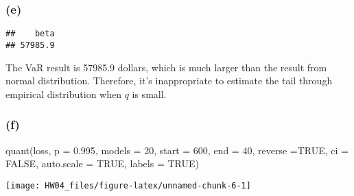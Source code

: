 \documentclass[
]{article}
\newenvironment{Shaded}{\begin{snugshade}}{\end{snugshade}}
\newcommand{\AttributeTok}[1]{\textcolor[rgb]{0.77,0.63,0.00}{#1}}
\newcommand{\ConstantTok}[1]{\textcolor[rgb]{0.00,0.00,0.00}{#1}}
\newcommand{\DecValTok}[1]{\textcolor[rgb]{0.00,0.00,0.81}{#1}}
\newcommand{\FloatTok}[1]{\textcolor[rgb]{0.00,0.00,0.81}{#1}}
\newcommand{\FunctionTok}[1]{\textcolor[rgb]{0.00,0.00,0.00}{#1}}
\newcommand{\NormalTok}[1]{#1}
\newcommand{\OtherTok}[1]{\textcolor[rgb]{0.56,0.35,0.01}{#1}}
\newcommand{\SpecialCharTok}[1]{\textcolor[rgb]{0.00,0.00,0.00}{#1}}
\begin{document}
\hypertarget{e}{%
\subsubsection{(e)}\label{e}}

\begin{Shaded}
\end{Shaded}

\begin{verbatim}
##    beta 
## 57985.9
\end{verbatim}

The VaR result is 57985.9 dollars, which is much larger than the result
from normal distribution. Therefore, it's inappropriate to estimate the
tail through empirical distribution when \(q\) is small.

\hypertarget{f}{%
\subsubsection{(f)}\label{f}}

\begin{Shaded}
\begin{Highlighting}[]
\FunctionTok{quant}\NormalTok{(loss, }\AttributeTok{p =} \FloatTok{0.995}\NormalTok{, }\AttributeTok{models =} \DecValTok{20}\NormalTok{, }\AttributeTok{start =} \DecValTok{600}\NormalTok{, }\AttributeTok{end =} \DecValTok{40}\NormalTok{, }\AttributeTok{reverse =}\ConstantTok{TRUE}\NormalTok{, }\AttributeTok{ci =} \ConstantTok{FALSE}\NormalTok{, }\AttributeTok{auto.scale =} \ConstantTok{TRUE}\NormalTok{, }\AttributeTok{labels =} \ConstantTok{TRUE}\NormalTok{)}
\end{Highlighting}
\end{Shaded}

\begin{center}\texttt{[image: HW04\_files/figure-latex/unnamed-chunk-6-1]} \end{center}
\end{document}

